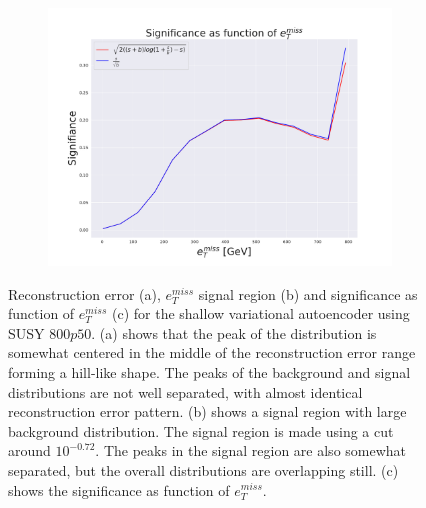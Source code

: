 \begin{figure}[h!]
    \hfill  
    \begin{subfigure}{.49\textwidth}
        \includegraphics[width=\textwidth]{Figures/VAE_testing/small/2lep/significance_etmiss_800p0p050_-0.8542149600758421.pdf}
        \caption{}
        \label{ffig:VAE_2lep_small_signi_800}
    \end{subfigure}
    \hfill      
    \caption[2lep shallow network | $800p50$ | VAE]{Reconstruction error (a), $e_T^{miss}$ signal region (b) and significance as function of 
    $e_T^{miss}$ (c) for the shallow variational autoencoder using SUSY $800p50$. 
    (a) shows that the peak of the distribution is somewhat centered in the middle 
    of the reconstruction error range forming a hill-like shape. The peaks of the background and signal 
    distributions are not well separated, with almost identical reconstruction error pattern. (b) 
    shows a signal region with large background distribution. The signal region is made using a cut around
    $10^{-0.72}$. The peaks in the signal region are also somewhat 
    separated, but the overall distributions are overlapping still. 
    (c) shows the significance as function of $e_T^{miss}$.}
    \label{fig:VAE_2lep_small_rec_sig_signi_800}
\end{figure}


